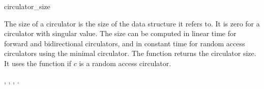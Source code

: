 
\begin{ccRefFunction}{circulator_size}

\ccDefinition


The size of a circulator is the size of the data structure it refers
to. It is zero for a circulator with singular value. The size can be
computed in linear time for forward and bidirectional circulators, and
in constant time for random access circulators using the minimal
circulator. The function 
returns the circulator size. It uses the
 function if $c$ is a random
access circulator.



\ccSeeAlso

,
,
,
.

\end{ccRefFunction}

